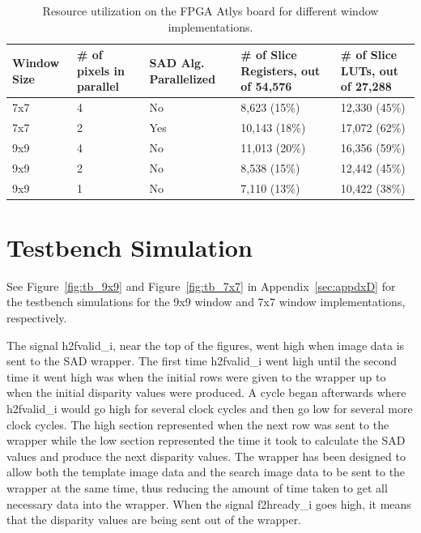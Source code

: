 \begin{table}
\begin{center}
	\begin{tabular}{| p{1.9cm} | p{2.2cm} | p{2.5cm} | p{2.9cm} | p{2.7cm} |}
		\hline
		\rowstyle{\bfseries} Window Size & 
		\rowstyle{\bfseries} \# of pixels in parallel & 
		\rowstyle{\bfseries} SAD Alg. Parallelized & 
		\rowstyle{\bfseries} \# of Slice Registers, out of 54,576 &
		\rowstyle{\bfseries} \# of Slice LUTs, out of 27,288 %
		\tabularnewline
		\hline
		7x7 & 4 & No & 8,623 (15\%) & 12,330 (45\%)
		\tabularnewline
		\hline 
		\rowstyle{\bfseries} 7x7 & 
		\rowstyle{\bfseries} 2 & 
		\rowstyle{\bfseries} Yes & 
		\rowstyle{\bfseries} 10,143 (18\%) & 
		\rowstyle{\bfseries} 17,072 (62\%)  
		\tabularnewline
		\hline 
		\rowstyle{\bfseries} 9x9 & 
		\rowstyle{\bfseries} 4 & 
		\rowstyle{\bfseries} No & 
		\rowstyle{\bfseries} 11,013 (20\%) & 
		\rowstyle{\bfseries} 16,356 (59\%) 
		\tabularnewline
		\hline
		9x9 & 2 & No & 8,538 (15\%) & 12,442 (45\%)
		\tabularnewline
		\hline 
		9x9 & 1 & No & 7,110 (13\%) & 10,422 (38\%)
		\tabularnewline
		\hline 
	\end{tabular}
	\captionfonts
	\caption{Resource utilization on the FPGA Atlys board for different window implementations.}
	\label{table:utilize}
\end{center}
\end{table}

\section{Testbench Simulation}
\label{sec:testbench}

See Figure~\ref{fig:tb_9x9} and Figure~\ref{fig:tb_7x7} in Appendix~\ref{sec:appdxD} for the testbench simulations for the 9x9 window and 7x7 window implementations, respectively.

The signal h2fvalid\_i, near the top of the figures, went high when image data is sent to the SAD wrapper. The first time h2fvalid\_i went high until the second time it went high was when the initial rows were given to the wrapper up to when the initial disparity values were produced. A cycle began afterwards where h2fvalid\_i would go high for several clock cycles and then go low for several more clock cycles. The high section represented when the next row was sent to the wrapper while the low section represented the time it took to calculate the SAD values and produce the next disparity values. The wrapper has been designed to allow both the template image data and the search image data to be sent to the wrapper at the same time, thus reducing the amount of time taken to get all necessary data into the wrapper. When the signal f2hready\_i goes high, it means that the disparity values are being sent out of the wrapper.


